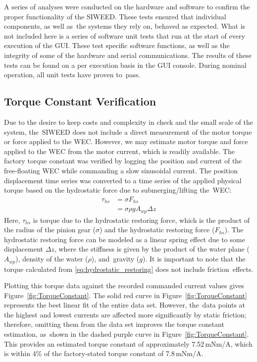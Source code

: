 \documentclass[hardware,article,submit,pdftex,moreauthors]{Definitions/mdpi}
\begin{document}
A series of analyses were conducted on the hardware and software to confirm the proper functionality of the SIWEED.
These tests ensured that individual components, as well as~the systems they rely on, behaved as expected.
What is not included here is a series of software unit tests that run at the start of every execution of the GUI.
These test specific software functions, as well as the integrity of some of the hardware and serial communications. 
The results of these tests can be found on a per execution basis in the GUI console.
During nominal operation, all unit tests have proven to~pass.

\subsection{Torque Constant Verification}\label{tConstSec}
Due to the desire to keep costs and complexity in check and the small scale of the system, the~SIWEED does not include a direct measurement of the motor torque or force applied to the WEC.
However, we may estimate motor torque and force applied to the WEC from the motor current, which is readily available.
The factory torque constant was verified by logging the position and current of the free-floating WEC while commanding a slow sinusoidal current.
The position displacement time series was converted to a time series of the applied physical torque based on the hydrostatic force due to submerging/lifting the~WEC:
%
\begin{equation}
\begin{aligned}
\tau_{hs} 
&= \sigma F_{hs} \\
&= \sigma \rho g A_{wp} \Delta z
\end{aligned}
\label{eq:hydrostatic_restoring}
\end{equation}
%
Here, $\tau_{hs}$ is torque due to the hydrostatic restoring force, which is the product of the radius of the pinion gear ($\sigma$) and the hydrostatic restoring force ($F_{hs}$).
The hydrostatic restoring force can be modeled as a linear spring effect due to some displacement $\Delta z$, where the stiffness is given by the product of the water plane ($A_{wp}$), density of the water ($\rho$), and~gravity ($g$).
It is important to note that the torque calculated from \eqref{eq:hydrostatic_restoring} does not include friction~effects.

Plotting this torque data against the recorded commanded current values gives  \mbox{Figure~\ref{fig:TorqueConstant}.}
The solid red curve in Figure~\ref{fig:TorqueConstant} represents the best linear fit of the entire data set.
However, the~data points at the highest and lowest currents are affected more significantly by static friction; therefore, omitting them from the data set improves the torque constant estimation, as~shown in the dashed purple curve in Figure~\ref{fig:TorqueConstant}.
This provides an estimated torque constant of approximately 7.52\,mNm/A, which is within 4\% of the factory-stated torque constant of 7.8\,mNm/A.
\end{document}
